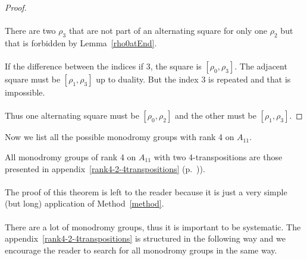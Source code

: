 \begin{proof}
\begin{figure}[H]
\begin{center}
\begin{tikzpicture}[scale=.8]
      \end{tikzpicture}
      \caption{}
    \end{center}
  \end{figure}

  \paragraph{}
  There are two $\rho_3$ that are not part of an alternating square for only one $\rho_2$ but that is forbidden by Lemma~\ref{rho0atEnd}.

  \paragraph{}
  If the difference between the indices if 3, the square is $[\rho_0, \rho_3]$. The adjacent square must be $[\rho_1, \rho_3]$ up to duality. But the index $3$ is repeated and that is impossible.

  \paragraph{}
  Thus one alternating square must be $[\rho_0, \rho_2]$ and the other must be $[\rho_1, \rho_3]$.

\end{proof}

Now we list all the possible monodromy groups with rank 4 on $A_{11}$.

\begin{lemma}
  \label{proof-2-1}
  All monodromy groups of rank 4 on $A_{11}$ with two 4-transpositions are those presented in appendix~\ref{rank4-2-4transpositions} (p.~\pageref{rank4-2-4transpositions})).
\end{lemma}

\paragraph{}
The proof of this theorem is left to the reader because it is just a very simple (but long) application of Method~\ref{method}.

\paragraph{}
There are a lot of monodromy groups, thus it is important to be systematic. The appendix~\ref{rank4-2-4transpositions} is structured in the following way and we encourage the reader to search for all monodromy groups in the same way.

